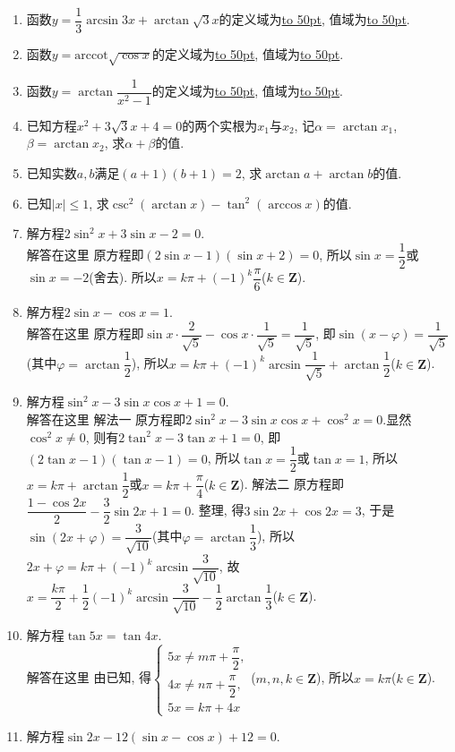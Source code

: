 \documentclass[10pt,a4paper]{article}
\newcommand{\blank}[1]{\underline{\hbox to #1pt{}}}
\begin{document}
\begin{enumerate}[1.]
\item 函数$y=\dfrac 13\arcsin 3x+\arctan \sqrt 3x$的定义域为\blank{50}, 值域为\blank{50}.
\item 函数$y=\mathrm{arccot} \sqrt {\cos x}$的定义域为\blank{50}, 值域为\blank{50}.
\item 函数$y=\arctan \dfrac 1{x^2-1}$的定义域为\blank{50}, 值域为\blank{50}.
\item 已知方程$x^2+3\sqrt 3x+4=0$的两个实根为$x_1$与$x_2$, 记$\alpha =\arctan x_1$, $\beta =\arctan x_2$, 求$\alpha +\beta$的值.
\item 已知实数$a,b$满足$(a+1)(b+1)=2$, 求$\arctan a+\arctan b$的值.
\item 已知$|x|\le 1$, 求$\csc ^2(\arctan x)-\tan ^2(\arccos x)$的值.
\item 解方程$2\sin ^2x+3\sin x-2=0$.\\
解答在这里  原方程即$(2\sin x-1)(\sin x+2)=0$, 所以$\sin x=\dfrac 12$或$\sin x=-2$(舍去).
所以$x=k\pi +(-1)^k\dfrac{\pi }6$($k\in \mathbf{Z}$).
\item 解方程$2\sin x-\cos x=1$.\\
解答在这里  原方程即$\sin x\cdot \dfrac 2{\sqrt 5}-\cos x\cdot \dfrac 1{\sqrt 5}=\dfrac 1{\sqrt 5}$, 即$\sin (x-\varphi)=\dfrac 1{\sqrt 5}$(其中$\varphi =\arctan \dfrac 12$),
所以$x=k\pi +(-1)^k\arcsin \dfrac 1{\sqrt 5}+\arctan \dfrac 12$($k\in \mathbf{Z}$).
\item 解方程$\sin ^2x-3\sin x\cos x+1=0$.\\
解答在这里 解法一  原方程即$2\sin ^2x-3\sin x\cos x+\cos ^2x=0$.显然$\cos ^2x\ne 0$,
则有$2\tan ^2x-3\tan x+1=0$, 即$(2\tan x-1)(\tan x-1)=0$,
所以$\tan x=\dfrac 12$或$\tan x=1$, 所以$x=k\pi +\arctan \dfrac 12$或$x=k\pi +\dfrac{\pi }4$($k\in \mathbf{Z}$).
解法二  原方程即$\dfrac{1-\cos 2x}2-\dfrac 32\sin 2x+1=0$.
整理, 得$3\sin 2x+\cos 2x=3$, 于是$\sin (2x+\varphi)=\dfrac 3{\sqrt {10}}$(其中$\varphi =\arctan \dfrac 13$),
所以$2x+\varphi =k\pi +(-1)^k\arcsin \dfrac 3{\sqrt {10}}$,
故$x=\dfrac{k\pi }2+\dfrac 12(-1)^k\arcsin \dfrac 3{\sqrt {10}}-\dfrac 12\arctan \dfrac 13$($k\in \mathbf{Z}$).
\item 解方程$\tan 5x=\tan 4x$.\\
解答在这里  由已知, 得$\begin{cases} 5x\ne m\pi +\dfrac{\pi }2, \\ 4x\ne n\pi +\dfrac{\pi }2, \\ 5x=k\pi +4x \end{cases}$($m,n,k\in \mathbf{Z}$), 所以$x=k\pi$($k\in \mathbf{Z}$).
\item 解方程$\sin 2x-12(\sin x-\cos x)+12=0$.\\

\end{enumerate}
\end{document}
